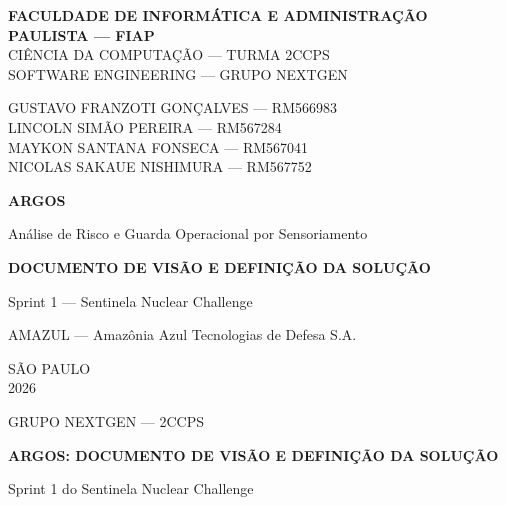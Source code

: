 \documentclass[12pt,a4paper,oneside]{article}
\begin{document}
\onehalfspacing

\thispagestyle{empty}
\begin{center}
{\large\bfseries FACULDADE DE INFORMÁTICA E ADMINISTRAÇÃO PAULISTA — FIAP}\\[2pt]
{\normalsize CIÊNCIA DA COMPUTAÇÃO — TURMA 2CCPS}\\[2pt]
{\normalsize SOFTWARE ENGINEERING — GRUPO NEXTGEN}

\vspace{1.4cm}
{\normalsize
GUSTAVO FRANZOTI GONÇALVES — RM566983\\
LINCOLN SIMÃO PEREIRA — RM567284\\
MAYKON SANTANA FONSECA — RM567041\\
NICOLAS SAKAUE NISHIMURA — RM567752\par}

\vspace{2.6cm}
{\LARGE\bfseries ARGOS\par}
\vspace{0.4cm}
{\large Análise de Risco e Guarda Operacional por Sensoriamento\par}
\vspace{0.8cm}
{\normalsize\bfseries DOCUMENTO DE VISÃO E DEFINIÇÃO DA SOLUÇÃO\par}
\vspace{0.3cm}
{\normalsize Sprint 1 — Sentinela Nuclear Challenge\par}
\vspace{0.2cm}
{\normalsize AMAZUL — Amazônia Azul Tecnologias de Defesa S.A.\par}

\vfill
{\normalsize SÃO PAULO\\2026\par}
\end{center}
\newpage

\thispagestyle{empty}
\begin{center}
{\normalsize GRUPO NEXTGEN — 2CCPS\par}
\vspace{2.4cm}
{\large\bfseries ARGOS: DOCUMENTO DE VISÃO E DEFINIÇÃO DA SOLUÇÃO\par}
\vspace{0.4cm}
{\normalsize Sprint 1 do Sentinela Nuclear Challenge\par}
\end{center}
\end{document}
